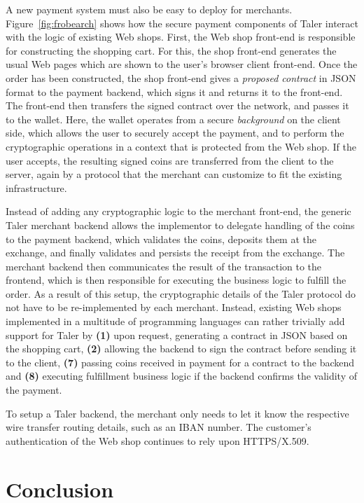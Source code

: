 \documentclass[twoside,letterpaper]{sigalternate}
\begin{document}
A new payment system must also be easy to deploy for merchants.
Figure~\ref{fig:frobearch} shows how the secure payment components of
Taler interact with the logic of existing Web shops.  First, the Web shop
front-end is responsible for constructing the shopping cart.  For this,
the shop front-end generates the usual Web pages which are shown to the
user's browser client front-end.  Once the order has been constructed,
the shop front-end gives a {\em proposed contract} in JSON format to
the payment backend, which signs it and returns it to the front-end.
The front-end then transfers the signed contract over the network, and
passes it to the wallet.  Here, the wallet operates from a secure {\em
background} on the client side, which allows the user to securely
accept the payment, and to perform the cryptographic operations in a
context that is protected from the Web shop.  If the user accepts, the
resulting signed coins are transferred from the client to the server,
again by a protocol that the merchant can customize to fit the
existing infrastructure.



Instead of adding any cryptographic logic to the merchant front-end,
the generic Taler merchant backend allows the implementor to delegate
handling of the coins to the payment backend, which validates the
coins, deposits them at the exchange, and finally validates and
persists the receipt from the exchange.  The merchant backend then
communicates the result of the transaction to the front\-end, which is
then responsible for executing the business logic to fulfill the
order.
As a result of this setup, the cryptographic details of the
Taler protocol do not have to be re-implemented by each merchant.
Instead, existing Web shops implemented in a multitude of programming
languages can rather trivially add support for Taler by {\bf (1)} upon
request, generating a contract in JSON based on the shopping cart,
{\bf (2)} allowing the backend to sign the contract before sending it
to the client, {\bf (7)} passing coins received in payment for a
contract to the backend and {\bf (8)} executing fulfillment business
logic if the backend confirms the validity of the payment.


To setup a Taler backend, the merchant only needs to let it know the
respective wire transfer routing details, such as an IBAN number.  The
customer's authentication of the Web shop continues to rely upon
\mbox{HTTPS}/X.509.

\section{Conclusion}
\end{document}
